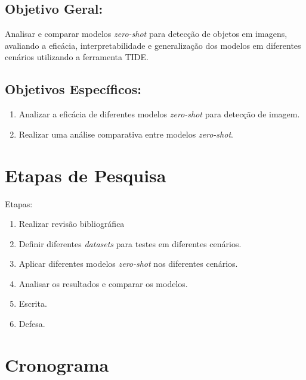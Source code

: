 \documentclass[openany, a4paper,12pt, oneside]{article}
\begin{document}
\subsection{Objetivo Geral:}

Analisar e comparar modelos \textit{zero-shot} para detecção de objetos em imagens, avaliando a eficácia, interpretabilidade e generalização dos modelos em diferentes cenários utilizando a ferramenta TIDE.

\subsection{Objetivos Espec\'{i}ficos:}
\begin{enumerate}
  \item Analizar a efic\'{a}cia de diferentes modelos \textit{zero-shot} para detec\c{c}\~{a}o de imagem.
  \item Realizar uma an\'{a}lise comparativa entre modelos \textit{zero-shot}.
\end{enumerate}

\section{Etapas de Pesquisa}

Etapas:
\begin{enumerate}
  \item Realizar revis\~{a}o bibliogr\'{a}fica
  \item Definir diferentes \textit{datasets} para testes em diferentes cen\'{a}rios.
  \item Aplicar diferentes modelos \textit{zero-shot} nos diferentes cen\'{a}rios.
  \item Analisar os resultados e comparar os modelos.
  \item Escrita.
  \item Defesa.
\end{enumerate}

\section{Cronograma}
\end{document}
